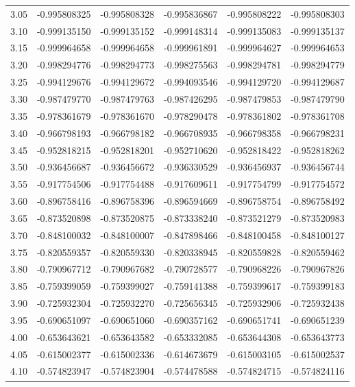 \documentclass[11pt,a4paper]{article}
\begin{document}
\begin{longtable}{rrrrrr}
3.05 & -0.995808325 & -0.995808328 & -0.995836867 & -0.995808222 & -0.995808303 \\
3.10 & -0.999135150 & -0.999135152 & -0.999148314 & -0.999135083 & -0.999135137 \\
3.15 & -0.999964658 & -0.999964658 & -0.999961891 & -0.999964627 & -0.999964653 \\
3.20 & -0.998294776 & -0.998294773 & -0.998275563 & -0.998294781 & -0.998294779 \\
3.25 & -0.994129676 & -0.994129672 & -0.994093546 & -0.994129720 & -0.994129687 \\
3.30 & -0.987479770 & -0.987479763 & -0.987426295 & -0.987479853 & -0.987479790 \\
3.35 & -0.978361679 & -0.978361670 & -0.978290478 & -0.978361802 & -0.978361708 \\
3.40 & -0.966798193 & -0.966798182 & -0.966708935 & -0.966798358 & -0.966798231 \\
3.45 & -0.952818215 & -0.952818201 & -0.952710620 & -0.952818422 & -0.952818262 \\
3.50 & -0.936456687 & -0.936456672 & -0.936330529 & -0.936456937 & -0.936456744 \\
3.55 & -0.917754506 & -0.917754488 & -0.917609611 & -0.917754799 & -0.917754572 \\
3.60 & -0.896758416 & -0.896758396 & -0.896594669 & -0.896758754 & -0.896758492 \\
3.65 & -0.873520898 & -0.873520875 & -0.873338240 & -0.873521279 & -0.873520983 \\
3.70 & -0.848100032 & -0.848100007 & -0.847898466 & -0.848100458 & -0.848100127 \\
3.75 & -0.820559357 & -0.820559330 & -0.820338945 & -0.820559828 & -0.820559462 \\
3.80 & -0.790967712 & -0.790967682 & -0.790728577 & -0.790968226 & -0.790967826 \\
3.85 & -0.759399059 & -0.759399027 & -0.759141388 & -0.759399617 & -0.759399183 \\
3.90 & -0.725932304 & -0.725932270 & -0.725656345 & -0.725932906 & -0.725932438 \\
3.95 & -0.690651097 & -0.690651060 & -0.690357162 & -0.690651741 & -0.690651239 \\
4.00 & -0.653643621 & -0.653643582 & -0.653332085 & -0.653644308 & -0.653643773 \\
4.05 & -0.615002377 & -0.615002336 & -0.614673679 & -0.615003105 & -0.615002537 \\
4.10 & -0.574823947 & -0.574823904 & -0.574478588 & -0.574824715 & -0.574824116 \\

\end{longtable}
\end{document}
